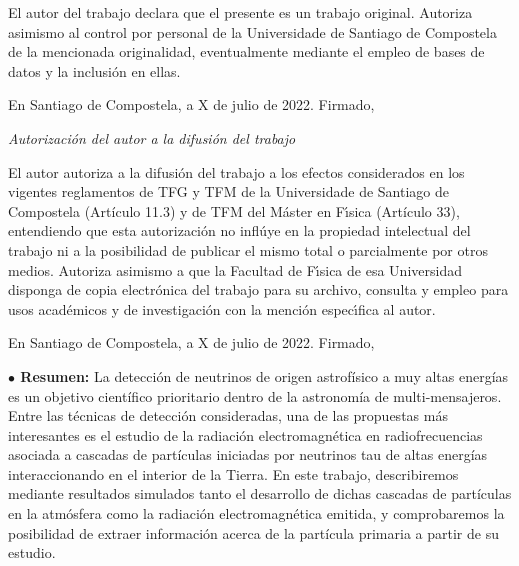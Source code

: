 \documentclass[12 pt, a4paper]{article} %
\numberwithin{equation}{section}
\numberwithin{figure}{section}
\numberwithin{table}{section}
\begin{document}
	El autor del trabajo declara que el presente es un trabajo original. Autoriza asimismo al control por personal de la Universidade de Santiago de Compostela de la mencionada originalidad, eventualmente mediante el empleo de bases de datos y la inclusi\'on en ellas.
	
	En Santiago de Compostela, a X de julio de 2022. Firmado,\vspace{3cm}
	
	
	{\sl Autorizaci\'on del autor a la difusi\'on del trabajo}
	
	 El autor autoriza a la difusi\'on del trabajo a los efectos considerados en los vigentes reglamentos de TFG y TFM de la Universidade de Santiago de Compostela (Artículo 11.3) y de TFM del M\'aster en F\'{\i}sica (Artículo 33), entendiendo que esta autorizaci\'on no infl\'uye en la propiedad intelectual del trabajo ni a la posibilidad de publicar el mismo total o parcialmente por otros medios. Autoriza asimismo a que la Facultad de F\'{\i}sica de esa Universidad disponga de copia electr\'onica del trabajo para su archivo, consulta y empleo para usos acad\'emicos y de investigaci\'on con la menci\'on espec\'{\i}fica al autor. 
	
	En Santiago de Compostela, a X de julio de 2022. Firmado,\
	
	\thispagestyle{empty}
	\pagebreak

	\thispagestyle{empty} %
	\pagebreak
	
		\begin{flushleft}  {\bf $\bullet$ Resumen:\;\;}
		La detección de neutrinos de origen astrofísico a muy altas energías es un objetivo científico prioritario dentro de la astronomía de multi-mensajeros. Entre las técnicas de detección consideradas, una de las propuestas más interesantes es el estudio de la radiación electromagnética en radiofrecuencias asociada a cascadas de partículas iniciadas por neutrinos tau de altas energías interaccionando en el interior de la Tierra. En este trabajo, describiremos mediante resultados simulados tanto el desarrollo de dichas cascadas de partículas en la atmósfera como la radiación electromagnética emitida, y comprobaremos la posibilidad de extraer información acerca de la partícula primaria a partir de su estudio.
	\end{flushleft}\mbox{}
\end{document}

